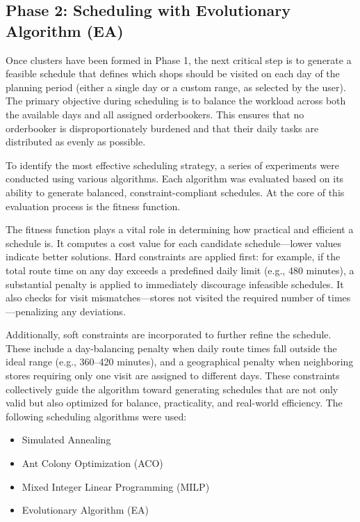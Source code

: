\subsection{Phase 2: Scheduling with Evolutionary Algorithm (EA)}
Once clusters have been formed in Phase 1, the next critical step is to generate a feasible schedule that defines which shops should be visited on each day of the planning period (either a single day or a custom range, as selected by the user). The primary objective during scheduling is to balance the workload across both the available days and all assigned orderbookers. This ensures that no orderbooker is disproportionately burdened and that their daily tasks are distributed as evenly as possible.

To identify the most effective scheduling strategy, a series of experiments were conducted using various algorithms. Each algorithm was evaluated based on its ability to generate balanced, constraint-compliant schedules. At the core of this evaluation process is the fitness function.

The fitness function plays a vital role in determining how practical and efficient a schedule is. It computes a cost value for each candidate schedule—lower values indicate better solutions. Hard constraints are applied first: for example, if the total route time on any day exceeds a predefined daily limit (e.g., 480 minutes), a substantial penalty is applied to immediately discourage infeasible schedules. It also checks for visit mismatches—stores not visited the required number of times—penalizing any deviations.

Additionally, soft constraints are incorporated to further refine the schedule. These include a day-balancing penalty when daily route times fall outside the ideal range (e.g., 360–420 minutes), and a geographical penalty when neighboring stores requiring only one visit are assigned to different days. These constraints collectively guide the algorithm toward generating schedules that are not only valid but also optimized for balance, practicality, and real-world efficiency. The following scheduling algorithms were used:

\begin{itemize}
    \item Simulated Annealing
    \item Ant Colony Optimization (ACO)
    \item Mixed Integer Linear Programming (MILP)
    \item Evolutionary Algorithm (EA)
\end{itemize}

